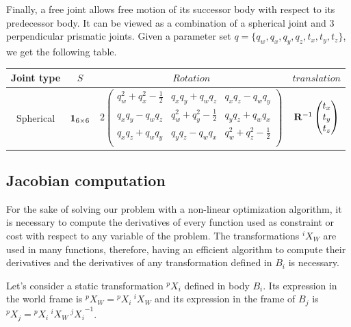 Finally, a free joint allows free motion of its successor body with respect to its predecessor body.
It can be viewed as a combination of a spherical joint and 3 perpendicular prismatic joints.
Given a parameter set $q = \{ q_w, q_x, q_y, q_z, t_x, t_y, t_z\}$, we get the following table.

\begin{tabular}{cccc}
  \toprule
  Joint type & $S$ & $Rotation$ & $translation$ \\
  \midrule
  Spherical
  &
  ${\bf 1}_{6\times 6}$
  &
  $2 \begin{pmatrix}
    q_w^2 +q_x^2-\frac{1}{2} & q_x q_y + q_w q_z & q_x q_z - q_w q_y \\
    q_x q_y - q_w q_z & q_w^2 +q_y^2-\frac{1}{2} & q_y q_z + q_w q_x \\
    q_x q_z + q_w q_y & q_y q_z - q_w q_x & q_w^2 +q_z^2-\frac{1}{2} \\
  \end{pmatrix}$
  &
  ${\bf R}^{-1}\begin{pmatrix}
    t_x \\ t_y \\ t_z
  \end{pmatrix}$
  \\
  \bottomrule
\end{tabular}



\subsection{Jacobian computation}
\label{sub:jacobian_computation}


For the sake of solving our problem with a non-linear optimization algorithm, it is necessary to compute the derivatives of every function used as constraint or cost with respect to any variable of the problem.
The transformations ${}^i X_W$ are used in many functions, therefore, having an efficient algorithm to compute their derivatives and the derivatives of any transformation defined in $B_i$ is necessary.

Let's consider a static transformation ${}^p X_i$ defined in body $B_i$.
Its expression in the world frame is ${}^p X_W = {}^p X_i\ {}^i X_W$ and its expression in the frame of $B_j$ is ${}^p X_j = {}^p X_i\ {}^i X_W\ {{}^j X_i}^{-1}$.

